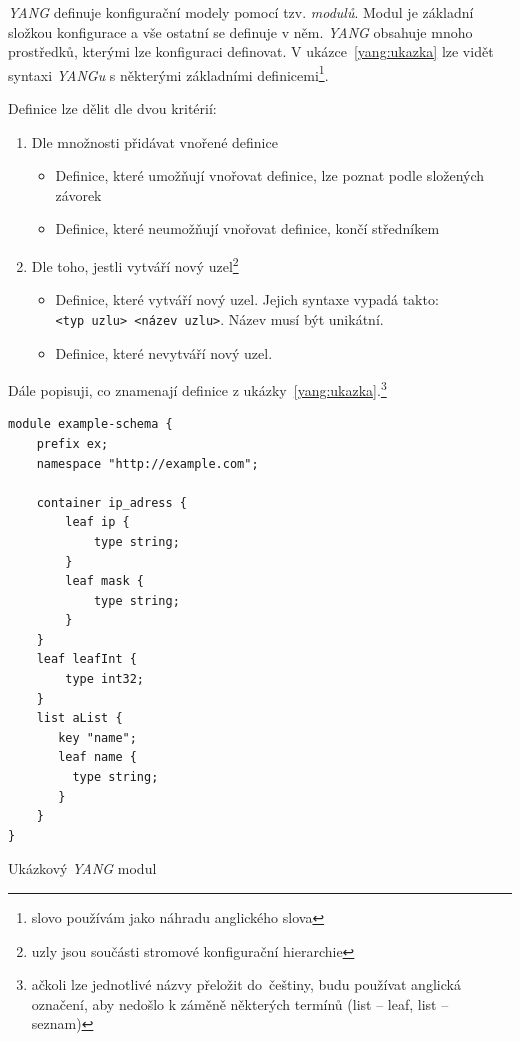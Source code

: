 \documentclass[thesis=B,czech,hidelinks]{FITthesis}[2019/03/06]
\begin{document}
\textit{YANG} definuje konfigurační modely pomocí tzv. \textit{modulů}. Modul je základní složkou konfigurace a vše ostatní se definuje v něm. \textit{YANG} obsahuje mnoho prostředků, kterými lze konfiguraci definovat. V ukázce~\ref{yang:ukazka} lze vidět syntaxi \textit{YANGu} s některými základními definicemi\footnote{slovo  používám jako náhradu anglického slova }.

Definice lze dělit dle dvou kritérií:

\begin{enumerate}
    \item Dle množnosti přidávat vnořené definice
        \begin{itemize}
            \item Definice, které umožňují vnořovat definice, lze poznat podle složených závorek
            \item Definice, které neumožňují vnořovat definice, končí středníkem
        \end{itemize}
    \item Dle toho, jestli vytváří nový uzel\footnote{uzly jsou součásti stromové konfigurační hierarchie}
        \begin{itemize}
            \item Definice, které vytváří nový uzel. Jejich syntaxe vypadá takto:
                \texttt{<typ~uzlu>~<název~uzlu>}. Název musí být unikátní.
            \item Definice, které nevytváří nový uzel.
        \end{itemize}
\end{enumerate}

Dále popisuji, co znamenají definice z ukázky~\ref{yang:ukazka}.\footnote{ačkoli lze jednotlivé názvy přeložit do~češtiny, budu používat anglická označení, aby nedošlo k záměně některých termínů (list -- leaf, list -- seznam)}

\begin{listing}[H]
\begin{verbatim}
module example-schema {
    prefix ex;
    namespace "http://example.com";

    container ip_adress {
        leaf ip {
            type string;
        }
        leaf mask {
            type string;
        }
    }
    leaf leafInt {
        type int32;
    }
    list aList {
       key "name";
       leaf name {
         type string;
       }
    }
}
\end{verbatim}
\caption{Ukázkový \textit{YANG} modul}\label{yang:ukazka}
\end{listing}
\end{document}
